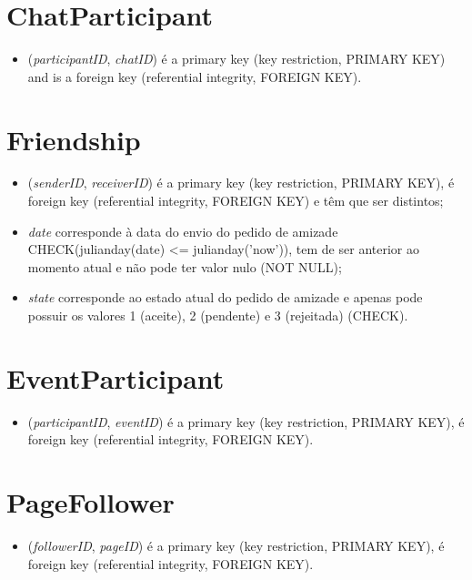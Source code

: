 \documentclass[12pt]{report}
\begin{document}
\section{ChatParticipant}

\begin{itemize}
    \item (\textit{participantID}, \textit{chatID}) é a primary key (key restriction, PRIMARY KEY) and is a foreign key (referential integrity, FOREIGN KEY).
\end{itemize}

\section{Friendship}

\begin{itemize}
    \item (\textit{senderID}, \textit{receiverID}) é a primary key (key restriction, PRIMARY KEY), é foreign key (referential integrity, FOREIGN KEY) e têm que ser distintos;
    \item \textit{date} corresponde à data do envio do pedido de amizade CHECK(julianday(date) <= julianday('now')), tem de ser anterior ao momento atual e não pode ter valor nulo (NOT NULL);
    \item \textit{state} corresponde ao estado atual do pedido de amizade e apenas pode possuir os valores 1 (aceite), 2 (pendente) e 3 (rejeitada) (CHECK).
\end{itemize}

\section{EventParticipant}

\begin{itemize}
    \item (\textit{participantID}, \textit{eventID}) é a primary key (key restriction, PRIMARY KEY), é foreign key (referential integrity, FOREIGN KEY).
\end{itemize}

\section{PageFollower}

\begin{itemize}
    \item (\textit{followerID}, \textit{pageID}) é a primary key (key restriction, PRIMARY KEY), é foreign key (referential integrity, FOREIGN KEY).
\end{itemize}
\end{document}
